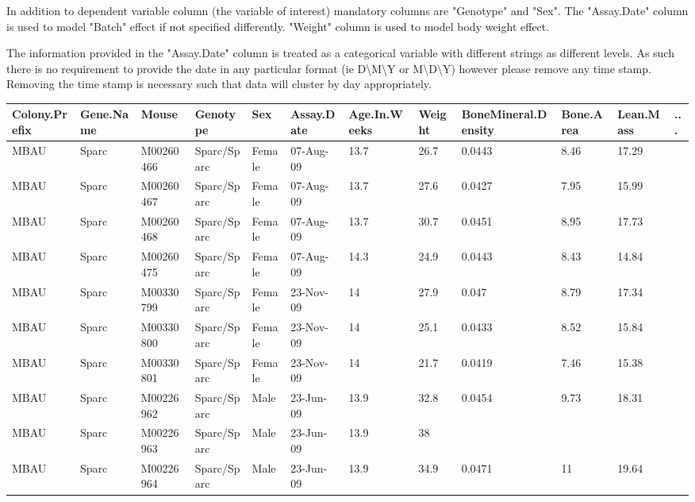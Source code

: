 \documentclass[12pt,a4paper]{article}
\begin{document}
In addition to dependent variable column (the variable of interest) mandatory columns are "Genotype" and "Sex". The "Assay.Date" column is used to model "Batch" effect if not specified differently. "Weight" column is used to model body weight effect.

The information provided in the "Assay.Date" column is treated as a categorical variable with different strings as different levels.  As such there is no requirement to provide the date in any particular format (ie D\textbackslash M\textbackslash Y or M\textbackslash D\textbackslash Y) however please remove any time stamp.  Removing the time stamp is necessary such that data will cluster by day appropriately.
\begin{table}
 \begin{tabular}{| p{13mm} | p{13mm} | l | l | l | p{19mm}| p{12mm} | l | p{13mm} | p{12mm} | p{12mm} | l |}
  \hline
Colony.\newline Prefix&Gene.\newline Name&Mouse&\textbf{Genotype}&\textbf{Sex}&\textbf{Assay.\newline Date}&Age.In.\newline Weeks&\textbf{Weight}&Bone\newline Mineral.\newline Density&Bone.\newline Area&Lean.\newline Mass& ... \\\hline
MBAU&Sparc&M00260466&Sparc/Sparc&Female&07-Aug-09&13.7&26.7&0.0443&8.46&17.29&\\
MBAU&Sparc&M00260467&Sparc/Sparc&Female&07-Aug-09&13.7&27.6&0.0427&7.95&15.99&\\
MBAU&Sparc&M00260468&Sparc/Sparc&Female&07-Aug-09&13.7&30.7&0.0451&8.95&17.73&\\
MBAU&Sparc&M00260475&Sparc/Sparc&Female&07-Aug-09&14.3&24.9&0.0443&8.43&14.84&\\
MBAU&Sparc&M00330799&Sparc/Sparc&Female&23-Nov-09&14&27.9&0.047&8.79&17.34&\\
MBAU&Sparc&M00330800&Sparc/Sparc&Female&23-Nov-09&14&25.1&0.0433&8.52&15.84&\\
MBAU&Sparc&M00330801&Sparc/Sparc&Female&23-Nov-09&14&21.7&0.0419&7.46&15.38&\\
MBAU&Sparc&M00226962&Sparc/Sparc&Male&23-Jun-09&13.9&32.8&0.0454&9.73&18.31&\\
MBAU&Sparc&M00226963&Sparc/Sparc&Male&23-Jun-09&13.9&38&&&&\\
MBAU&Sparc&M00226964&Sparc/Sparc&Male&23-Jun-09&13.9&34.9&0.0471&11&19.64&\\

\end{tabular}
\end{table}
\end{document}
